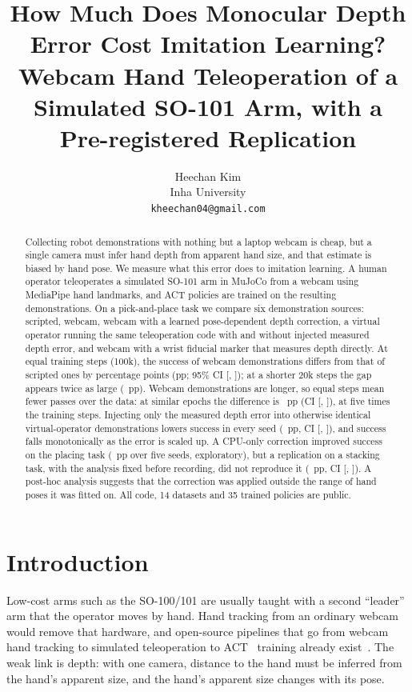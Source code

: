 \documentclass[10pt]{article}
\title{How Much Does Monocular Depth Error Cost Imitation Learning?\\
\large Webcam Hand Teleoperation of a Simulated SO-101 Arm, with a Pre-registered Replication}
\author{Heechan Kim\\ Inha University\\ \texttt{kheechan04@gmail.com}}
\date{\todo{date}}
\begin{document}
\maketitle

\begin{abstract}
Collecting robot demonstrations with nothing but a laptop webcam is cheap, but a single camera must infer hand depth from apparent hand size, and that estimate is biased by hand pose.
We measure what this error does to imitation learning.
A human operator teleoperates a simulated SO-101 arm in MuJoCo from a webcam using MediaPipe hand landmarks, and ACT policies are trained on the resulting demonstrations.
On a pick-and-place task we compare six demonstration sources: scripted, webcam, webcam with a learned pose-dependent depth correction, a virtual operator running the same teleoperation code with and without injected measured depth error, and webcam with a wrist fiducial marker that measures depth directly.
At equal training steps (100k), the success of webcam demonstrations differs from that of scripted ones by \lossMean{} percentage points (pp; 95\% CI [\lossLo, \lossHi]); at a shorter 20k steps the gap appears twice as large (\lossShortMean{}~pp).
Webcam demonstrations are longer, so equal steps mean fewer passes over the data: at similar epochs the difference is \lossEpochMean{}~pp (CI [\lossEpochLo, \lossEpochHi]), at five times the training steps.
Injecting only the measured depth error into otherwise identical virtual-operator demonstrations lowers success in every seed (\depthvirtMean{}~pp, CI [\depthvirtLo, \depthvirtHi]), and success falls monotonically as the error is scaled up.
A CPU-only correction improved success on the placing task (\corrMean{}~pp over five seeds, exploratory), but a replication on a stacking task, with the analysis fixed before recording, did not reproduce it (\stackCorrMean{}~pp, CI [\stackCorrLo, \stackCorrHi]).
A post-hoc analysis suggests that the correction was applied outside the range of hand poses it was fitted on.
All code, 14 datasets and 35 trained policies are public.
\end{abstract}

\section{Introduction}

Low-cost arms such as the SO-100/101 are usually taught with a second ``leader'' arm that the operator moves by hand.
Hand tracking from an ordinary webcam would remove that hardware, and open-source pipelines that go from webcam hand tracking to simulated teleoperation to ACT~\citep{zhao2023act} training already exist~\citep{handrobot}.
The weak link is depth: with one camera, distance to the hand must be inferred from the hand's apparent size, and the hand's apparent size changes with its pose.
\end{document}
